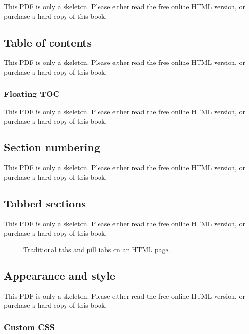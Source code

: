 \documentclass[
  11pt,
]{krantz}
\theoremstyle{definition}
\theoremstyle{definition}
\theoremstyle{definition}
\theoremstyle{definition}
\theoremstyle{remark}
\begin{document}
This PDF is only a skeleton. Please either read the free online HTML version, or purchase a hard-copy of this book.

\subsection{Table of contents}\label{table-of-contents}

This PDF is only a skeleton. Please either read the free online HTML version, or purchase a hard-copy of this book.

\subsubsection{Floating TOC}\label{floating-toc}

This PDF is only a skeleton. Please either read the free online HTML version, or purchase a hard-copy of this book.

\subsection{Section numbering}\label{section-numbering}

This PDF is only a skeleton. Please either read the free online HTML version, or purchase a hard-copy of this book.

\subsection{Tabbed sections}\label{tabbed-sections}

This PDF is only a skeleton. Please either read the free online HTML version, or purchase a hard-copy of this book.

\begin{figure}\caption{Traditional tabs and pill tabs on an HTML page.}\end{figure}

\subsection{Appearance and style}\label{appearance-and-style}

This PDF is only a skeleton. Please either read the free online HTML version, or purchase a hard-copy of this book.

\subsubsection{Custom CSS}\label{custom-css}
\end{document}
